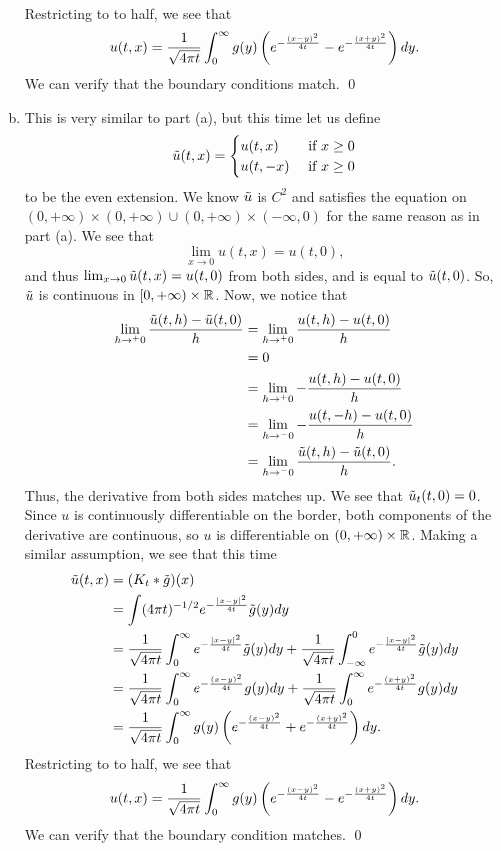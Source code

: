 \documentclass{article}
\begin{document}
\begin{enumerate}[(a)]
\begin{align*}
    \end{align*} 
    Restricting to to half, we see that 
    \[u(t,x) = \frac{1}{\sqrt{4\pi t}}\int_{0}^\infty  g(y)\del{ e^{-\frac{(x-y)^2}{4t}} - e^{-\frac{(x+y)^2}{4t}}}dy.\]
    We can verify that the boundary conditions match. \qed
    \item This is very similar to part (a), but this time let us define 
    \[\tilde{u}(t,x) = \begin{cases}
        u(t,x) &\text{ if } x \ge 0 \\
        u(t,-x) &\text{ if } x \ge 0 \\
    \end{cases}\]
    to be the even extension. 
    \hop 
    We know $\tilde{u}$ is $C^2$ and satisfies the equation on  $(0, +\infty) \times (0, +\infty)  \cup (0, +\infty) \times (-\infty, 0)$ for the same reason as in part (a). 
    \hop 
    We see that 
    \[\lim_{x \to 0} u(t,x) = u(t,0),\]
    and thus $\lim_{x \to 0} \tilde{u}(t,x) = u(t,0)$ from both sides, and is equal to $\tilde{u}(t,0)$. So, $\tilde{u}$ is continuous in $[0,+\infty)\times \mathbb{R}$. 
    \hop 
    Now, we notice that 
    \begin{align*}
        \lim_{h\to^+ 0} \frac{\tilde{u}(t,h)- \tilde{u}(t,0)}{h}
        &= \lim_{h\to^+ 0} \frac{u(t,h) - u(t,0)}{h}\\
        &= 0 \\
        &= \lim_{h\to^+ 0} -\frac{u(t,h) - u(t,0)}{h}\\
        &= \lim_{h\to^- 0} -\frac{u(t,-h) - u(t,0)}{h}\\
        &= \lim_{h\to^- 0} \frac{\tilde{u}(t,h)-\tilde{u}(t,0)}{h}.\\
    \end{align*}
    Thus, the derivative from both sides matches up. We see that $\tilde{u}_t(t,0) = 0$. Since $u$ is continuously differentiable on the border, both components of the derivative are continuous, so $u$ is differentiable on $(0, +\infty) \times \mathbb{R}$. 
    \hop 
    Making a similar assumption, we see that this time 
    \begin{align*}
        \tu(t,x) &= (K_t * \tilde{g})(x)\\
        &= \int(4\pi t)^{-1/2} e^{-\frac{|x-y|^2}{4t}} \tilde{g}(y)dy\\
        &=  \frac{1}{\sqrt{4\pi t}}\int_{0}^\infty  e^{-\frac{|x-y|^2}{4t}} \tilde{g}(y)dy+ \frac{1}{\sqrt{4\pi t}}\int_{-\infty}^0  e^{-\frac{|x-y|^2}{4t}} \tilde{g}(y)dy\\
        &=  \frac{1}{\sqrt{4\pi t}}\int_{0}^\infty  e^{-\frac{(x-y)^2}{4t}} g(y)dy+ \frac{1}{\sqrt{4\pi t}}\int_{0}^\infty  e^{-\frac{(x+y)^2}{4t}} g(y)dy\\
        &=  \frac{1}{\sqrt{4\pi t}}\int_{0}^\infty  g(y)\del{ e^{-\frac{(x-y)^2}{4t}} + e^{-\frac{(x+y)^2}{4t}}}dy.\\
    \end{align*} 
    Restricting to to half, we see that 
    \[u(t,x) = \frac{1}{\sqrt{4\pi t}}\int_{0}^\infty  g(y)\del{ e^{-\frac{(x-y)^2}{4t}} - e^{-\frac{(x+y)^2}{4t}}}dy.\]
    We can verify that the boundary condition matches. \qed
\end{enumerate}
\end{document}
